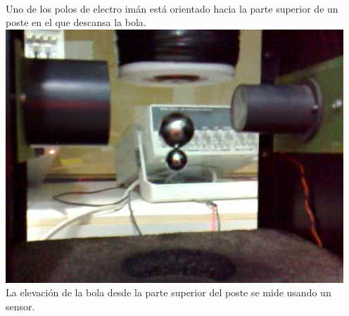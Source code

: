 \documentclass[12pt,a4paper]{book}
\begin{document}
\\
Uno de los polos de electro imán está orientado hacia la parte superior de un poste en el que descansa la bola.\\
\includegraphics[scale=1]{./3_image.jpeg}
\\
La elevación de la bola desde la parte superior del poste se mide usando un sensor.\\
\newpage
\end{document}

